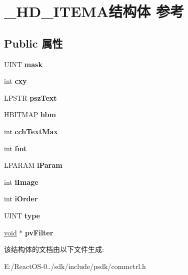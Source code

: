 \hypertarget{struct___h_d___i_t_e_m_a}{}\section{\+\_\+\+H\+D\+\_\+\+I\+T\+E\+M\+A结构体 参考}
\label{struct___h_d___i_t_e_m_a}
\subsection*{Public 属性}
\begin{DoxyCompactItemize}
\item 
\mbox{\label{struct___h_d___i_t_e_m_a_a2d99de369f5fa5ebde1ce304e0249435}} 
U\+I\+NT {\bfseries mask}
\item 
\mbox{\label{struct___h_d___i_t_e_m_a_abf569857a6c82f5c6ed4e522d58cb456}} 
int {\bfseries cxy}
\item 
\mbox{\label{struct___h_d___i_t_e_m_a_a6aa46294de86c65bc7ba2ff3528da873}} 
L\+P\+S\+TR {\bfseries psz\+Text}
\item 
\mbox{\label{struct___h_d___i_t_e_m_a_a1e098382d024b1a6a8f8e0a494886fe6}} 
H\+B\+I\+T\+M\+AP {\bfseries hbm}
\item 
\mbox{\label{struct___h_d___i_t_e_m_a_ab862ba2fd1f238439edb57145e27c522}} 
int {\bfseries cch\+Text\+Max}
\item 
\mbox{\label{struct___h_d___i_t_e_m_a_a3187c5dde57783494939471ea60da801}} 
int {\bfseries fmt}
\item 
\mbox{\label{struct___h_d___i_t_e_m_a_aa4fe599f74d866986f0bdd6fc033c241}} 
L\+P\+A\+R\+AM {\bfseries l\+Param}
\item 
\mbox{\label{struct___h_d___i_t_e_m_a_a2515937cdd322d9f7f5239b5e5f8ef95}} 
int {\bfseries i\+Image}
\item 
\mbox{\label{struct___h_d___i_t_e_m_a_ae7c0ea66c9bd4946649ec33f06f82038}} 
int {\bfseries i\+Order}
\item 
\mbox{\label{struct___h_d___i_t_e_m_a_a960ff32ce46d2b3f0f7e3b6a81a16476}} 
U\+I\+NT {\bfseries type}
\item 
\mbox{\label{struct___h_d___i_t_e_m_a_ac559c580ede34cdc2403419aedb7b851}} 
\hyperlink{interfacevoid}{void} $\ast$ {\bfseries pv\+Filter}
\end{DoxyCompactItemize}


该结构体的文档由以下文件生成\+:\begin{DoxyCompactItemize}
\item 
E\+:/\+React\+O\+S-\/0../sdk/include/psdk/commctrl.\+h\end{DoxyCompactItemize}
